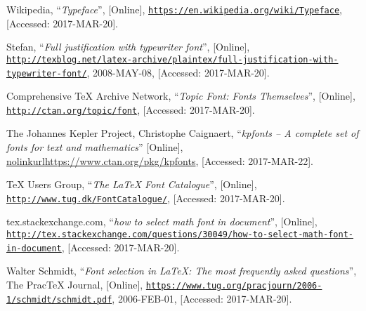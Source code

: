 \documentclass[a4paper,oneside,11pt]{article}
\begin{document}
\begin{thebibliography}{1}

        Wikipedia,
        ``\emph{Typeface}'',
        [Online],
        \href{https://en.wikipedia.org/wiki/Typeface}
             {\nolinkurl{https://en.wikipedia.org/wiki/Typeface}},
        [Accessed: 2017-MAR-20].

        Stefan,
        ``\emph{Full justification with typewriter font}'',
        [Online],
        \href{http://texblog.net/latex-archive/plaintex/full-justification-with-typewriter-font/}
             {\nolinkurl{http://texblog.net/latex-archive/plaintex/full-justification-with-typewriter-font/}},
        2008-MAY-08,
        [Accessed: 2017-MAR-20].

        Comprehensive \TeX{} Archive Network,
        ``\emph{Topic Font: Fonts Themselves}'',
        [Online],
        \href{http://ctan.org/topic/font}
             {\nolinkurl{http://ctan.org/topic/font}},
        [Accessed: 2017-MAR-20].

        The Johannes Kepler Project, Christophe Caignaert,
        ``\emph{kpfonts -- A complete set of fonts for text and mathematics}''
        [Online],
        \href{https://www.ctan.org/pkg/kpfonts}
             {nolinkurl{https://www.ctan.org/pkg/kpfonts}},
        [Accessed: 2017-MAR-22].

        \TeX{} Users Group,
        ``\emph{The \LaTeX{} Font Catalogue}'',
        [Online],
        \href{http://www.tug.dk/FontCatalogue/}
             {\nolinkurl{http://www.tug.dk/FontCatalogue/}},
        [Accessed: 2017-MAR-20].

        tex.stackexchange.com,
        ``\emph{how to select math font in document}'',
        [Online],
        \href{http://tex.stackexchange.com/questions/30049/how-to-select-math-font-in-document}
             {\nolinkurl{http://tex.stackexchange.com/questions/30049/how-to-select-math-font-in-document}},
        [Accessed: 2017-MAR-20].

        Walter Schmidt,
        ``\emph{Font selection in \LaTeX{}: The most frequently asked questions}'',
        The Prac\TeX{} Journal,
        [Online],
        \href{https://www.tug.org/pracjourn/2006-1/schmidt/schmidt.pdf}
             {\nolinkurl{https://www.tug.org/pracjourn/2006-1/schmidt/schmidt.pdf}},
        2006-FEB-01,
        [Accessed: 2017-MAR-20].


\end{thebibliography}
\end{document}
